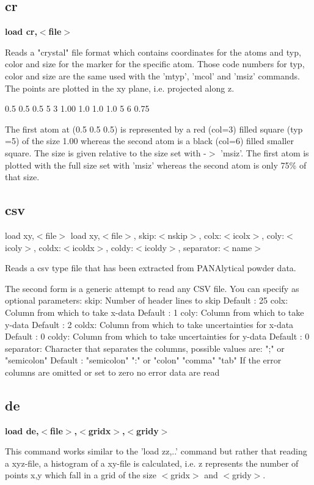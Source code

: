 \subsection*{cr}
{\bf load cr,$ <$file$> $ \par }
\par
\vspace{3pt}
Reads a "crystal" file format which contains coordinates for 
the atoms and typ, color and size for the marker for the specific 
atom. Those code numbers for typ, color and size are the same used 
with the 'mtyp', 'mcol' and 'msiz' commands. The points are plotted 
in the xy plane, i.e. projected along z. 
\par
\begin{MacVerbatim}
  0.5 0.5 0.5   5 3 1.00
  1.0 1.0 1.0   5 6 0.75
\end{MacVerbatim}
The first atom at (0.5 0.5 0.5) is represented by a red (col=3) 
filled square (typ =5) of the size 1.00 whereas the second atom 
is a black (col=6) filled smaller square. The size is given relative 
to the size set with -$> $ 'msiz'. The first atom is plotted with the 
full size set with 'msiz' whereas the second atom is only 75\% of 
that size. 
\subsection*{csv}
load xy,$ <$file$> $ 
load xy,$ <$file$> $, skip:$ <$nskip$> $, 
        colx:$ <$icolx$> $, coly:$ <$icoly$> $, coldx:$ <$icoldx$> $, coldy:$ <$icoldy$> $, 
        separator:$ <$name$> $ 
\par
Reads a csv type file that has been extracted from PANAlytical 
powder data. 
\par
The second form is a generic attempt to read any CSV file. 
You can specify as optional parameters: 
skip:  Number of header lines to skip     Default : 25 
colx:  Column from which to take x-data   Default :  1 
coly:  Column from which to take y-data   Default :  2 
coldx: Column from which to take uncertainties for x-data Default : 0 
coldy: Column from which to take uncertainties for y-data Default : 0 
separator: Character that separates the columns, possible values are: 
           ";" or "semicolon"             Default  : "semicolon" 
           ":" or "colon" 
           "comma" 
           "tab" 
If the error columns are omitted or set to zero no error data are read 
\subsection*{de}
{\bf load de,$ <$file$> $,$ <$gridx$> $,$ <$gridy$> $ \par }
\par
\vspace{3pt}
This command works similar to the 'load zz,..' command but rather 
that reading a xyz-file, a histogram of a xy-file is calculated, 
i.e. z represents the number of points x,y which fall in a grid 
of the size $ <$gridx$> $ and $ <$gridy$> $. 

